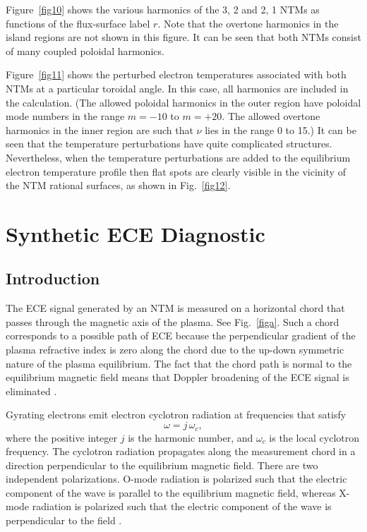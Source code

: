 \documentclass{iopjournal}
\begin{document}
{ Figure~\ref{fig10} shows the various harmonics of the 3, 2 and 2, 1 NTMs as functions of the flux-surface
label $r$. Note that
the overtone harmonics in the island regions are not shown in this figure. It can be seen that both NTMs consist of many coupled poloidal harmonics. 

Figure~\ref{fig11} shows
the perturbed electron temperatures associated with both NTMs at a particular toroidal angle. In this case, all harmonics are included in the calculation. (The allowed poloidal harmonics in the
outer region have poloidal mode numbers in the range $m=-10$ to $m=+20$. The allowed overtone harmonics in the inner region are such that
$\nu$ lies in the range $0$ to 15.) It can be seen that the temperature perturbations have quite complicated structures. Nevertheless, when the temperature perturbations are
added to the equilibrium electron temperature profile then flat spots are clearly visible in the vicinity of the NTM rational surfaces, as shown in Fig.~\ref{fig12}. 

\section{Synthetic ECE Diagnostic}\label{s6}
\subsection{Introduction}
The ECE signal generated by an NTM is  measured on a horizontal chord that passes through the magnetic axis of the plasma. See Fig.~\ref{figa}.  Such a chord corresponds to a possible  path of ECE because 
the perpendicular gradient of the plasma refractive index is zero along the chord due to the up-down symmetric nature of the plasma equilibrium. The fact that the
chord path is normal to the equilibrium magnetic field means that Doppler
broadening of the ECE signal is eliminated \cite{ece4a,ece5,bornatici}. 

Gyrating electrons emit electron cyclotron radiation at frequencies that satisfy \cite{bornatici}
\begin{equation}
\omega= j\,\omega_c,
\end{equation}
where the positive integer $j$ is the harmonic number, and $\omega_c$ is the local cyclotron frequency. The cyclotron radiation propagates  along the
measurement chord in a direction perpendicular to the equilibrium magnetic field. There are two independent polarizations. O-mode radiation is
polarized such that the electric component of the wave is parallel to the equilibrium magnetic field, whereas X-mode radiation is polarized such that the
electric component of the wave is perpendicular to the field \cite{plasma}.

}
\end{document}
